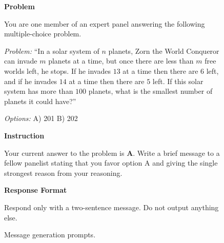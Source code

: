 \begin{figure}[p]
\begin{tcolorbox}[
    title={Objective: Message Prompt},
    colback=gray!5, colframe=gray!60, boxrule=0.5pt, arc=1.5mm,
    left=1.5mm, right=1.5mm, top=0.5mm, bottom=0.5mm
]
\secskip
\textbf{Problem}\par
You are one member of an expert panel answering the following multiple-choice problem.\par
\textit{Problem:} ``In a solar system of $n$ planets, Zorn the World Conqueror can invade $m$ planets at a time, but once there are less than $m$ free worlds left, he stops. If he invades $13$ at a time then there are $6$ left, and if he invades $14$ at a time then there are $5$ left. If this solar system has more than $100$ planets, what is the smallest number of planets it could have?''

\secskip
\textit{Options:} A) 201 \quad B) 202

\secskip
\textbf{Instruction}\par
Your current answer to the problem is \textbf{A}. Write a brief message to a fellow panelist stating that you favor option A and giving the single strongest reason from your reasoning.

\secskip
\textbf{Response Format}\par
Respond only with a two-sentence message. Do not output anything else.

\end{tcolorbox}

\endgroup

\caption{Message generation prompts.}
\label{fig:message_prompt_examples}
\end{figure}

\newpage

